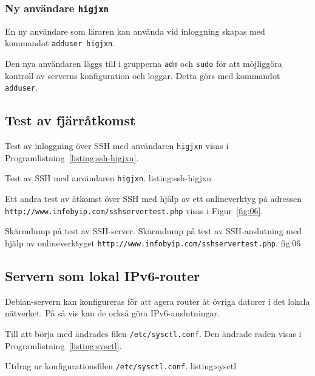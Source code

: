 \subsubsection{Ny användare \texttt{higjxn}}
En ny användare som läraren kan använda vid inloggning skapas med kommandot
\texttt{adduser higjxn}.

Den nya användaren läggs till i grupperna \texttt{adm} och \texttt{sudo} för
att möjliggöra kontroll av serverns konfiguration och loggar. Detta görs med
kommandot \texttt{adduser}.


\subsection{Test av fjärråtkomst}
Test av inloggning över SSH med användaren \texttt{higjxn} visas i
Programlistning~\ref{listing:ssh-higjxn}.

            {Test av SSH med användaren \texttt{higjxn}.}
            {listing:ssh-higjxn}

Ett andra test av åtkomst över SSH med hjälp av ett onlineverktyg på adressen
\texttt{http://www.infobyip.com/sshservertest.php} \cite{ipv6:sshservertest}
visas i Figur~\ref{fig:06}.

           {Skärmdump på test av SSH-server.}
					 {Skärmdump på test av SSH-anslutning med hjälp av onlineverktyget 
				    \texttt{http://www.infobyip.com/sshservertest.php}.}
           {fig:06}


\subsection{Servern som lokal IPv6-router}
Debian-servern kan konfigureras för att agera router åt övriga datorer i det
lokala nätverket. På så vis kan de också göra IPv6-anslutningar.

Till att börja med ändrades filen \texttt{/etc/sysctl.conf}. Den ändrade
raden visas i Programlistning~\ref{listing:sysctl}.

             {Utdrag ur konfigurationsfilen \texttt{/etc/sysctl.conf}.}
             {listing:sysctl}
